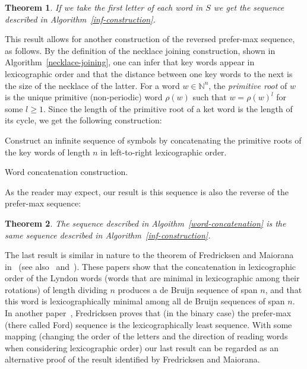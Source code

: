 \documentclass{article}
\newtheorem{theorem}{Theorem}
\theoremstyle{definition}
\newcommand{\N}{{\mathbb{N}}}
\begin{document}
\begin{theorem}
	If we take the first letter of each word in $S$ we get the sequence described in Algorithm~\ref{inf-construction}.
\end{theorem}

This result allows for another construction of the reversed prefer-max sequence, as follows. By the definition of the necklace joining construction, shown in Algorithm~\ref{necklace-joining}, one can infer that key words appear in lexicographic order and that the distance between one key words to the next is the size of the necklace of the latter. For a word $w\in\N^n$, the \emph{primitive root} of $w$ is the  unique primitive (non-periodic) word $\rho(w)$ such that $w = \rho(w)^l$ for some $l \geq 1$. Since the length of the primitive root of a ket word is the length of its cycle, we get the following construction:


\begin{algorithm}[!h]
	Construct an infinite sequence of symbols by concatenating the primitive roots  of the key words of length $n$ in left-to-right lexicographic order.
	\caption{Word concatenation construction.}
	\label{word-concatenation}
\end{algorithm}

As the reader may expect, our result is this sequence is also the reverse of the prefer-max sequence:

\begin{theorem}
	The sequence described in Algoithm~\ref{word-concatenation} is the same sequence described in Algorithm~\ref{inf-construction}.
\end{theorem}

The last result is similar in nature to the theorem of Fredricksen and Maiorana in~\cite{Fredricksen1978} (see also~\cite{Moreno2004} and~\cite{Moreno2015}).	
These papers show that the concatenation in lexicographic order of the Lyndon words (words that are minimal in lexicographic among their rotations) of length dividing $n$ produces a de Bruijn sequence of span $n$, and that this word is lexicographically minimal among all de Bruijn sequences of span $n$. In another paper~\cite{Fredricksen1970}, Fredricksen proves that (in the binary case) the prefer-max (there called Ford) sequence is the lexicographically least sequence. With some mapping (changing the order of the letters and the direction of reading words when considering lexicographic order) our last result can be regarded as an alternative proof of the result identified by Fredricksen and Maiorana.


{}

\end{document}
